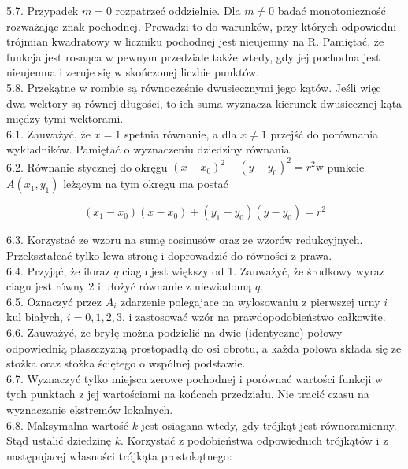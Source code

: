 \documentclass[10pt]{article}
\begin{document}
5.7. Przypadek $m=0$ rozpatrzeć oddzielnie. Dla $m \neq 0$ badać monotoniczność rozważając znak pochodnej. Prowadzi to do warunków, przy których odpowiedni trójmian kwadratowy w liczniku pochodnej jest nieujemny na R. Pamiętać, że funkcja jest rosnąca w pewnym przedziale także wtedy, gdy jej pochodna jest nieujemna i zeruje się w skończonej liczbie punktów.\\
5.8. Przekątne w rombie są równocześnie dwusiecznymi jego kątów. Jeśli więc dwa wektory są równej długości, to ich suma wyznacza kierunek dwusiecznej kąta między tymi wektorami.\\
6.1. Zauważyć, że $x=1$ spetnia równanie, a dla $x \neq 1$ przejść do porównania wykładników. Pamiętać o wyznaczeniu dziedziny równania.\\
6.2. Równanie stycznej do okręgu $\left(x-x_{0}\right)^{2}+\left(y-y_{0}\right)^{2}=r^{2} \mathrm{w}$ punkcie $A\left(x_{1}, y_{1}\right)$ leżącym na tym okręgu ma postać

$$
\left(x_{1}-x_{0}\right)\left(x-x_{0}\right)+\left(y_{1}-y_{0}\right)\left(y-y_{0}\right)=r^{2}
$$

6.3. Korzystać ze wzoru na sumę cosinusów oraz ze wzorów redukcyjnych. Przekształcać tylko lewa stronę i doprowadzić do równości z prawa.\\
6.4. Przyjąć, że iloraz $q$ ciagu jest większy od 1. Zauważyć, że środkowy wyraz ciagu jest równy 2 i ułożyć równanie z niewiadomą $q$.\\
6.5. Oznaczyć przez $A_{i}$ zdarzenie polegajace na wylosowaniu z pierwszej urny $i$ kul białych, $i=0,1,2,3$, i zastosować wzór na prawdopodobieństwo całkowite.\\
6.6. Zauważyć, że bryłę można podzielić na dwie (identyczne) połowy odpowiednią płaszczyzną prostopadłą do osi obrotu, a każda połowa składa się ze stożka oraz stożka ściętego o wspólnej podstawie.\\
6.7. Wyznaczyć tylko miejsca zerowe pochodnej i porównać wartości funkcji w tych punktach z jej wartościami na końcach przedziału. Nie tracić czasu na wyznaczanie ekstremów lokalnych.\\
6.8. Maksymalna wartość $k$ jest osiagana wtedy, gdy trójkąt jest równoramienny. Stąd ustalić dziedzinę $k$. Korzystać z podobieństwa odpowiednich trójkątów i z następujacej własności trójkąta prostokątnego:
\end{document}
